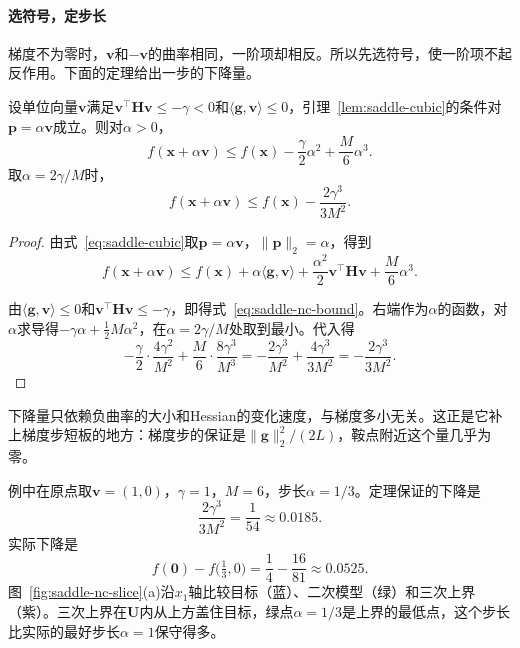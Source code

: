 \paragraph{选符号，定步长}
梯度不为零时，$\bm{v}$和$-\bm{v}$的曲率相同，一阶项却相反。所以先选符号，使一阶项不起反作用。下面的定理给出一步的下降量。

\begin{theorem}[负曲率步的下降]
 \label{thm:saddle-nc-step}
 设单位向量$\bm{v}$满足$\bm{v}^\top\bm{H}\bm{v}\leq-\gamma<0$和$\langle\bm{g},\bm{v}\rangle\leq0$，引理~\ref{lem:saddle-cubic}的条件对$\bm{p}=\alpha\bm{v}$成立。则对$\alpha>0$，
 \begin{equation}
  f(\bm{x}+\alpha\bm{v})\leq f(\bm{x})-\frac{\gamma}{2}\alpha^2+\frac{M}{6}\alpha^3.
  \label{eq:saddle-nc-bound}
 \end{equation}
 取$\alpha=2\gamma/M$时，
 \begin{equation}
  f(\bm{x}+\alpha\bm{v})\leq f(\bm{x})-\frac{2\gamma^3}{3M^2}.
  \label{eq:saddle-nc-decrease}
 \end{equation}
\end{theorem}

\begin{proof}
 由式~\eqref{eq:saddle-cubic}取$\bm{p}=\alpha\bm{v}$，$\lVert\bm{p}\rVert_2=\alpha$，得到
 \[
  f(\bm{x}+\alpha\bm{v})\leq f(\bm{x})+\alpha\langle\bm{g},\bm{v}\rangle+\frac{\alpha^2}{2}\bm{v}^\top\bm{H}\bm{v}+\frac{M}{6}\alpha^3.
 \]

 由$\langle\bm{g},\bm{v}\rangle\leq0$和$\bm{v}^\top\bm{H}\bm{v}\leq-\gamma$，即得式~\eqref{eq:saddle-nc-bound}。右端作为$\alpha$的函数，对$\alpha$求导得$-\gamma\alpha+\tfrac12M\alpha^2$，在$\alpha=2\gamma/M$处取到最小。代入得
 \[
  -\frac{\gamma}{2}\cdot\frac{4\gamma^2}{M^2}+\frac{M}{6}\cdot\frac{8\gamma^3}{M^3}
  =-\frac{2\gamma^3}{M^2}+\frac{4\gamma^3}{3M^2}
  =-\frac{2\gamma^3}{3M^2}.
 \]
\end{proof}

下降量只依赖负曲率的大小和Hessian的变化速度，与梯度多小无关。这正是它补上梯度步短板的地方：梯度步的保证是$\lVert\bm{g}\rVert_2^2/(2L)$，鞍点附近这个量几乎为零。

例中在原点取$\bm{v}=(1,0)$，$\gamma=1$，$M=6$，步长$\alpha=1/3$。定理保证的下降是
\[
 \frac{2\gamma^3}{3M^2}=\frac{1}{54}\approx0.0185.
\]
实际下降是
\[
 f(\bm{0})-f\bigl(\tfrac13,0\bigr)=\frac14-\frac{16}{81}\approx0.0525.
\]
图~\ref{fig:saddle-nc-slice}(a)沿$x_1$轴比较目标（蓝）、二次模型（绿）和三次上界（紫）。三次上界在$\bm{U}$内从上方盖住目标，绿点$\alpha=1/3$是上界的最低点，这个步长比实际的最好步长$\alpha=1$保守得多。

